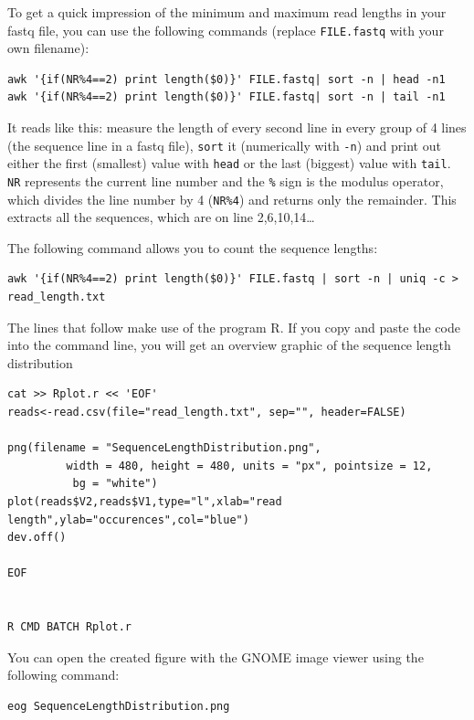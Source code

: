 \documentclass[11pt]{article}
\begin{document}
To get a quick impression of the minimum and maximum read lengths in
your fastq file, you can use the following commands (replace
\texttt{FILE.fastq} with your own filename):

\begin{verbatim}
awk '{if(NR%4==2) print length($0)}' FILE.fastq| sort -n | head -n1
awk '{if(NR%4==2) print length($0)}' FILE.fastq| sort -n | tail -n1
\end{verbatim}

It reads like this: measure the length of every second line in every
group of 4 lines (the sequence line in a fastq file), \texttt{sort} it
(numerically with \texttt{-n}) and print out either the first (smallest)
value with \texttt{head} or the last (biggest) value with \texttt{tail}. \texttt{NR}
represents the current line number and the \texttt{\%} sign is the modulus
operator, which divides the line number by 4 (\texttt{NR\%4}) and returns only
the remainder. This extracts all the sequences, which are on line
2,6,10,14\ldots{}


The following command allows you to count the sequence lengths:

\begin{verbatim}
awk '{if(NR%4==2) print length($0)}' FILE.fastq | sort -n | uniq -c > read_length.txt
\end{verbatim}

The lines that follow make use of the program R. If you copy and
paste the code into the command line, you will get an overview graphic
of the sequence length distribution 

\begin{verbatim}
cat >> Rplot.r << 'EOF'
reads<-read.csv(file="read_length.txt", sep="", header=FALSE)

png(filename = "SequenceLengthDistribution.png",
         width = 480, height = 480, units = "px", pointsize = 12,
          bg = "white")
plot(reads$V2,reads$V1,type="l",xlab="read length",ylab="occurences",col="blue")
dev.off()

EOF


R CMD BATCH Rplot.r
\end{verbatim}

You can open the created figure with the GNOME image viewer using the
following command:

\begin{verbatim}
eog SequenceLengthDistribution.png
\end{verbatim}
\end{document}
